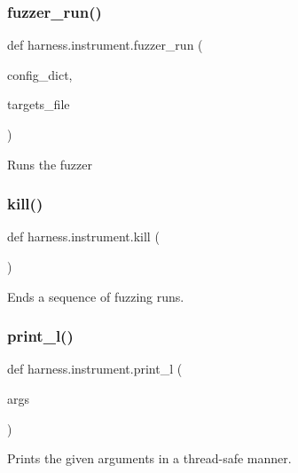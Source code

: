 \subsubsection{\texorpdfstring{fuzzer\+\_\+run()}{fuzzer\_run()}}
{\footnotesize\ttfamily def harness.\+instrument.\+fuzzer\+\_\+run (\begin{DoxyParamCaption}\item[{}]{config\+\_\+dict,  }\item[{}]{targets\+\_\+file }\end{DoxyParamCaption})}

\begin{DoxyVerb}Runs the fuzzer \end{DoxyVerb}
 \mbox{\label{namespaceharness_1_1instrument_a55e75cb64e281c06b6d8d63d62bae2a4}} 
\subsubsection{\texorpdfstring{kill()}{kill()}}
{\footnotesize\ttfamily def harness.\+instrument.\+kill (\begin{DoxyParamCaption}{ }\end{DoxyParamCaption})}

\begin{DoxyVerb}Ends a sequence of fuzzing runs.
\end{DoxyVerb}
 \mbox{\label{namespaceharness_1_1instrument_aac6f9293f336546e35af93b6d96fc7c4}} 
\subsubsection{\texorpdfstring{print\+\_\+l()}{print\_l()}}
{\footnotesize\ttfamily def harness.\+instrument.\+print\+\_\+l (\begin{DoxyParamCaption}\item[{}]{args }\end{DoxyParamCaption})}

\begin{DoxyVerb}Prints the given arguments in a thread-safe manner.
\end{DoxyVerb}
 \mbox{\label{namespaceharness_1_1instrument_a2b147d723167f36660b9082c2bf03e5e}} 
